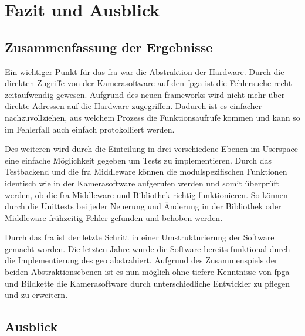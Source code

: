 \chapter{Fazit und Ausblick}


\section{Zusammenfassung der Ergebnisse}

Ein wichtiger Punkt für das \ac{fra} war die Abstraktion der Hardware. Durch die direkten Zugriffe von der Kamerasoftware auf den \ac{fpga} ist die Fehlersuche recht zeitaufwendig gewesen. Aufgrund des neuen \glspl{framework} wird nicht mehr über direkte Adressen auf die Hardware zugegriffen. Dadurch ist es einfacher nachzuvollziehen, aus welchem Prozess die Funktionsaufrufe kommen und kann so im Fehlerfall auch einfach protokolliert werden.


Des weiteren wird durch die Einteilung in drei verschiedene Ebenen im Userspace eine einfache Möglichkeit gegeben um Tests zu implementieren. Durch das Testbackend und die \ac{fra} Middleware können die modulspezifischen Funktionen identisch wie in der Kamerasoftware aufgerufen werden und somit überprüft werden, ob die \ac{fra} Middleware und Bibliothek richtig funktionieren. So können durch die Unittests bei jeder Neuerung und Änderung in der Bibliothek oder Middleware frühzeitig Fehler gefunden und behoben werden.


Durch das \ac{fra} ist der letzte Schritt in einer Umstrukturierung der Software gemacht worden. Die letzten Jahre wurde die Software bereits funktional durch die Implementierung des \ac{geo} abstrahiert. Aufgrund des Zusammenspiels der beiden Abstraktionsebenen ist es nun möglich ohne tiefere Kenntnisse von \ac{fpga} und Bildkette die Kamerasoftware durch unterschiedliche Entwickler zu pflegen und zu erweitern.


\section{Ausblick}

